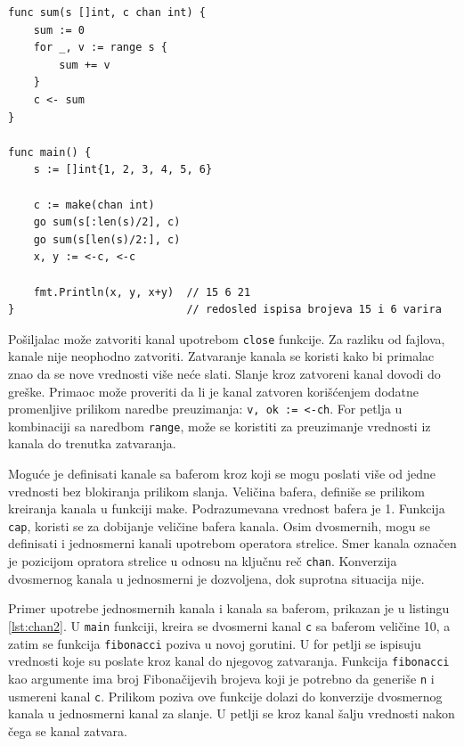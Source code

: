 \documentclass[12pt,oneside]{memoir}
\begin{document}
\begin{center}
\begin{lstlisting}[caption=Primer upotrebe kanala, label={lst:chan1},  backgroundcolor=\color{background}]
func sum(s []int, c chan int) {
	sum := 0
	for _, v := range s {
		sum += v
	}
	c <- sum 
}

func main() {
	s := []int{1, 2, 3, 4, 5, 6}

	c := make(chan int)
	go sum(s[:len(s)/2], c)
	go sum(s[len(s)/2:], c)
	x, y := <-c, <-c 

	fmt.Println(x, y, x+y)	// 15 6 21 
}							// redosled ispisa brojeva 15 i 6 varira
\end{lstlisting}
\end{center}

Pošiljalac može zatvoriti kanal upotrebom \texttt{close} funkcije. Za razliku od fajlova, kanale nije neophodno zatvoriti. Zatvaranje kanala se koristi kako bi primalac znao da se nove vrednosti više neće slati. Slanje kroz zatvoreni kanal dovodi do greške. Primaoc može proveriti da li je kanal zatvoren korišćenjem dodatne promenljive prilikom naredbe preuzimanja: \texttt{v, ok := <-ch}. For petlja u kombinaciji sa naredbom \texttt{range}, može se koristiti za preuzimanje vrednosti iz kanala do trenutka zatvaranja. 

Moguće je definisati kanale sa baferom kroz koji se mogu poslati više od jedne vrednosti bez blokiranja prilikom slanja. Veličina bafera, definiše se prilikom kreiranja kanala u funkciji make. Podrazumevana vrednost bafera je 1. Funkcija \texttt{cap}, koristi se za dobijanje veličine bafera kanala. Osim dvosmernih, mogu se definisati i jednosmerni kanali upotrebom operatora strelice. Smer kanala označen je pozicijom opratora strelice u odnosu na ključnu reč \texttt{chan}. Konverzija dvosmernog kanala u jednosmerni je dozvoljena, dok suprotna situacija nije. 

Primer upotrebe jednosmernih kanala i kanala sa baferom, prikazan je u listingu \ref{lst:chan2}. U \texttt{main} funkciji, kreira se dvosmerni kanal \texttt{c} sa baferom veličine 10, a zatim se funkcija \texttt{fibonacci} poziva u novoj gorutini. U for petlji se ispisuju vrednosti koje su poslate kroz kanal do njegovog zatvaranja. Funkcija \texttt{fibonacci} kao argumente ima  broj Fibonačijevih brojeva koji je potrebno da generiše \texttt{n} i usmereni kanal \texttt{c}. Prilikom poziva ove funkcije dolazi do konverzije dvosmernog kanala u jednosmerni kanal za slanje. U petlji se kroz kanal šalju vrednosti nakon čega se kanal zatvara.
\end{document}
